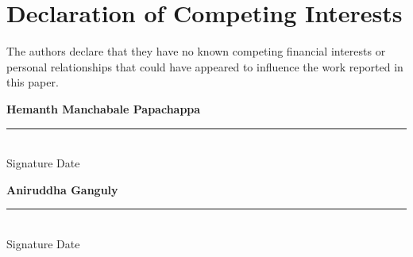 \documentclass[12pt]{article}
\begin{document}
\section*{Declaration of Competing Interests}

The authors declare that they have no known competing financial interests or personal relationships that could have appeared to influence the work reported in this paper.

\bigskip
\noindent
\textbf{Hemanth Manchabale Papachappa} \hfill \rule{5cm}{0.4pt} \\
Signature \hfill Date

\bigskip
\noindent
\textbf{Aniruddha Ganguly} \hfill \rule{5cm}{0.4pt} \\
Signature \hfill Date
\end{document}
